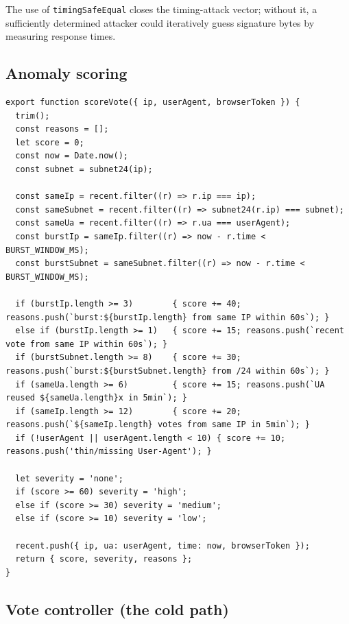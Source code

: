 The use of \texttt{timingSafeEqual} closes the timing-attack vector;
without it, a sufficiently determined attacker could iteratively guess
signature bytes by measuring response times.

\subsection{Anomaly scoring}

\begin{lstlisting}[caption={\texttt{server/services/anomalyDetector.js} (scoring)},label={lst:anom}]
export function scoreVote({ ip, userAgent, browserToken }) {
  trim();
  const reasons = [];
  let score = 0;
  const now = Date.now();
  const subnet = subnet24(ip);

  const sameIp = recent.filter((r) => r.ip === ip);
  const sameSubnet = recent.filter((r) => subnet24(r.ip) === subnet);
  const sameUa = recent.filter((r) => r.ua === userAgent);
  const burstIp = sameIp.filter((r) => now - r.time < BURST_WINDOW_MS);
  const burstSubnet = sameSubnet.filter((r) => now - r.time < BURST_WINDOW_MS);

  if (burstIp.length >= 3)        { score += 40; reasons.push(`burst:${burstIp.length} from same IP within 60s`); }
  else if (burstIp.length >= 1)   { score += 15; reasons.push(`recent vote from same IP within 60s`); }
  if (burstSubnet.length >= 8)    { score += 30; reasons.push(`burst:${burstSubnet.length} from /24 within 60s`); }
  if (sameUa.length >= 6)         { score += 15; reasons.push(`UA reused ${sameUa.length}x in 5min`); }
  if (sameIp.length >= 12)        { score += 20; reasons.push(`${sameIp.length} votes from same IP in 5min`); }
  if (!userAgent || userAgent.length < 10) { score += 10; reasons.push('thin/missing User-Agent'); }

  let severity = 'none';
  if (score >= 60) severity = 'high';
  else if (score >= 30) severity = 'medium';
  else if (score >= 10) severity = 'low';

  recent.push({ ip, ua: userAgent, time: now, browserToken });
  return { score, severity, reasons };
}
\end{lstlisting}

\subsection{Vote controller (the cold path)}

